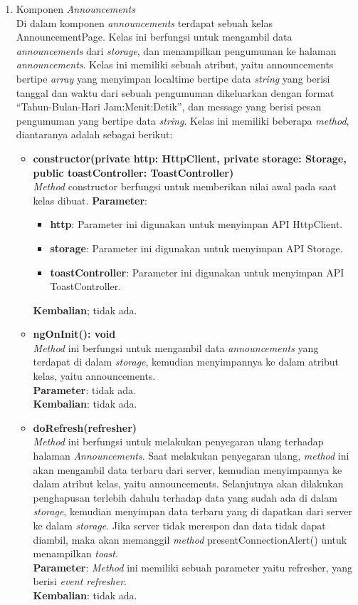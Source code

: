 \begin{enumerate}
	\item Komponen \textit{Announcements} \\
	Di dalam komponen \textit{announcements} terdapat sebuah kelas AnnouncementPage. Kelas ini berfungsi untuk mengambil data \textit{announcements} 	dari \textit{storage}, dan menampilkan pengumuman ke halaman \textit{announcements}. Kelas ini memiliki sebuah atribut, yaitu announcements bertipe \textit{array} yang menyimpan localtime bertipe data \textit{string} yang berisi tanggal dan waktu dari sebuah pengumuman dikeluarkan dengan format ``Tahun-Bulan-Hari Jam:Menit:Detik'', dan message yang berisi pesan pengumuman yang bertipe data \textit{string}. 
	Kelas ini memiliki beberapa \textit{method}, diantaranya adalah sebagai berikut:
	
	\begin{itemize}
		\item \textbf{constructor(private http: HttpClient, private storage: Storage, public toastController: ToastController)}\\
		\textit{Method} constructor berfungsi untuk memberikan nilai awal pada saat kelas dibuat.
		\textbf{Parameter}: 
		\begin{itemize}
			\item \textbf{http}: Parameter ini digunakan untuk menyimpan API HttpClient.
			\item \textbf{storage}: Parameter ini digunakan untuk menyimpan API Storage.
			\item \textbf{toastController}: Parameter ini digunakan untuk menyimpan API ToastController.
		\end{itemize}
		\textbf{Kembalian}; tidak ada.	
		
		\item \textbf{ngOnInit(): void}\\
		\textit{Method} ini berfungsi untuk mengambil data \textit{announcements} yang terdapat di dalam \textit{storage}, kemudian menyimpannya ke dalam atribut kelas, yaitu announcements. \\
		\textbf{Parameter}: tidak ada. \\
		\textbf{Kembalian}: tidak ada.	
		
		\item \textbf{doRefresh(refresher)} \\
		\textit{Method} ini berfungsi untuk melakukan penyegaran ulang terhadap halaman \textit{Announcements}. Saat melakukan penyegaran ulang, \textit{method} ini akan mengambil data terbaru dari server, kemudian menyimpannya ke dalam atribut kelas, yaitu announcements. Selanjutnya akan dilakukan penghapusan terlebih dahulu terhadap data yang sudah ada di dalam \textit{storage}, kemudian menyimpan data terbaru yang di dapatkan dari server ke dalam \textit{storage}. Jika server tidak merespon dan data tidak dapat diambil, maka akan memanggil \textit{method} presentConnectionAlert() untuk menampilkan \textit{toast}. \\
		\textbf{Parameter}: \textit{Method} ini memiliki sebuah parameter yaitu refresher, yang berisi \textit{event refresher}.\\
		\textbf{Kembalian}: tidak ada.
		

\end{itemize}
\end{enumerate}

